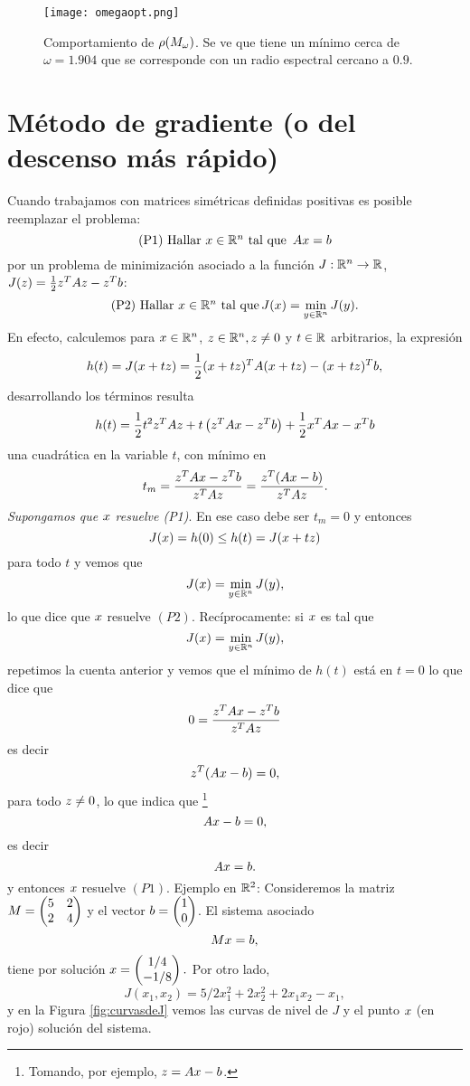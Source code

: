\begin{figure}[h]
\label{fig:omegasSor}
\centering\texttt{[image: omegaopt.png]}
\caption{Comportamiento de $\rho(\Mb_\omega)$. Se ve que tiene un mínimo cerca de $\omega=1.904$ que se corresponde con un radio espectral cercano a $0.9$. }
\end{figure}

\section{Método de gradiente (o del descenso más rápido)}
Cuando trabajamos con matrices simétricas definidas positivas es posible reemplazar el problema:
$$
\mbox{(P1) Hallar $\xb\in \R^n$ tal que
}\,\Ab\xb=\bb
$$
por un problema de minimización  asociado a la función  $J:\mathbb R^{n}\to \mathbb R$, $J(\zb)=\frac{1}{2}\zb^T\Ab\zb-\zb^T\bb$:
$$
\mbox{(P2) Hallar $\xb\in \Rn$ tal que}\, J(\xb)=
\min_{\yb\in \R^n}J(\yb).
$$
En efecto, calculemos para $\xb\in \Rn$, $\zb\in \Rn, \zb\ne\cero$ y $t\in \mathbb R$ arbitrarios, la expresión
$$
h(t)=J(\xb+t\zb)= \frac{1}{2}(\xb+t\zb)^T\Ab(\xb+t\zb)-(\xb+t\zb)^T\bb,
$$
desarrollando los términos resulta
\begin{equation}
\label{eq:derideh}
h(t)=\frac{1}{2}t^2\zb^T\Ab\zb+t\left(\zb^T\Ab\xb-\zb^T\bb\right) +\frac{1}{2}\xb^T\Ab\xb-\xb^T\bb
\end{equation}
una cuadr\'atica en la variable $t$, con mínimo en
\begin{equation}
\label{eq:minsearch}
t_m=\frac{\zb^T\Ab\xb-\zb^T\bb}{\zb^T\Ab\zb}=\frac{\zb^T(\Ab\xb-\bb)}{\zb^T\Ab\zb}.
\end{equation}
\emph{Supongamos que $\xb$ resuelve (P1)}. En ese caso debe ser $t_m=0$ y entonces
$$
J(\xb)=h(0)\le h(t)=J(\xb+t\zb)
$$
para todo $t$ y vemos que
$$
J(\xb)=\min_{\yb\in\Rn}J(\yb),
$$
lo que dice que $\xb$ resuelve $(P2)$.
Recíprocamente: si $\xb$ es tal que
$$
J(\xb)=\min_{\yb\in\Rn}J(\yb),
$$
repetimos la cuenta anterior y vemos que el mínimo de $h(t)$ está en $t=0$ lo que dice que
$$0=\frac{\zb^T\Ab\xb-\zb^T\bb}{\zb^T\Ab\zb}
$$
es decir
$$
\zb^T(\Ab\xb-\bb)=0,
$$
para todo $\zb\neq \cero$, lo que indica que \footnote{Tomando, por ejemplo, $\zb=\Ab\xb-\bb$.}
$$
\Ab\xb-\bb=\cero,
$$
es decir
$$
\Ab\xb=\bb.
 $$
 y entonces $\xb$ resuelve $(P1)$.
\tcc
Ejemplo en $\mathbb R^2$: Consideremos la matriz $
\Mb=\begin{pmatrix}
     5&2\\
     2&4
    \end{pmatrix}
$ y el vector  $
\bb=\begin{pmatrix}
     1\\
     0
    \end{pmatrix}
$. El sistema asociado
$$
\Mb\xb=\bb,
$$
tiene por solución $\xb=\begin{pmatrix}
    1/4\\
    -1/8
     \end{pmatrix}.
$
Por otro lado,
$$
J(x_1,x_2)=5/2x_1^2+2x_2^2+2x_1x_2-x_1,
$$
y en la Figura \ref{fig:curvasdeJ} vemos las curvas de nivel de $J$ y el punto $\xb$ (en rojo) solución del sistema.
\etcc

